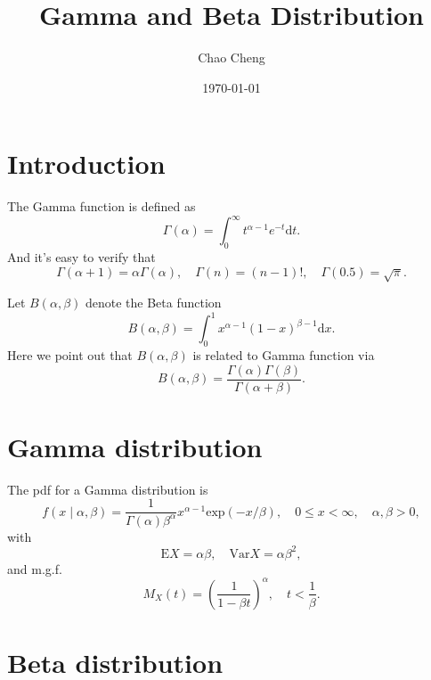 \documentclass[a4paper,12pt]{article}
\title{Gamma and Beta Distribution}
\author{Chao Cheng}
\date{\today}
\begin{document}
\maketitle

\tableofcontents{}

\section{Introduction}
\label{sec:introduction}

The Gamma function is defined as
\begin{equation}
  \label{eq:gamma_def}
  \Gamma\left(\alpha\right)
  = \int_0^\infty t^{\alpha - 1}e^{-t}\mathrm{d}t
  .
\end{equation}
And it's easy to verify that
\[
  \Gamma\left(\alpha + 1\right) = \alpha\Gamma\left(\alpha\right)
  ,\quad
  \Gamma\left(n\right) = \left(n - 1\right)!
  ,\quad
  \Gamma\left(0.5\right) = \sqrt{\pi}
  .
\]

Let $B\left(\alpha, \beta\right)$ denote the Beta function
\begin{equation}
  \label{eq:beta_def}
  B\left(\alpha, \beta\right) =
  \int_0^1x^{\alpha - 1}\left(1 - x\right)^{\beta - 1}\mathrm{d}x
  .
\end{equation}
Here we point out that $B\left(\alpha, \beta\right)$ is related to Gamma function via
\[
  B\left(\alpha, \beta\right) =
  \frac{\Gamma\left(\alpha\right)\Gamma\left(\beta\right)}{\Gamma\left(\alpha + \beta\right)}
  .
\]

\section{Gamma distribution}
\label{sec:gamma-distribution}

The pdf for a Gamma distribution is
\begin{equation}
  \label{eq:gamma_pdf}
  f\left(x\middle|\alpha, \beta\right)
  = \frac{1}{\Gamma\left(\alpha\right)\beta^\alpha}
  x^{\alpha - 1}
  \mathrm{exp}\left(-x / \beta\right)
  ,\quad
  0 \leq x < \infty
  ,\quad
  \alpha, \beta > 0
  ,
\end{equation}
with
\[
  \mathrm{E}X = \alpha\beta
  ,\quad
  \mathrm{Var}X = \alpha\beta^2
  ,
\]
and  m.g.f.
\[
  M_X\left(t\right) = \left(\frac{1}{1 - \beta t}\right)^\alpha
  ,\quad
  t < \frac{1}{\beta}
  .
\]

\section{Beta distribution}
\label{sec:beta-distribution}
\end{document}
